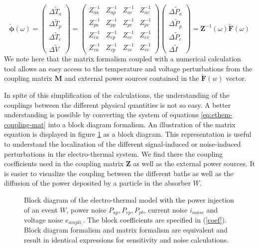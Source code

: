 \begin{equation}
\bm{\tilde{\phi}} (\omega) =
\left( \begin{array}{c}
\Delta \tilde{T}_a\\
\Delta \tilde{T}_p\\
\Delta \tilde{T}_e\\
\Delta \tilde{V}
\end{array} \right)
=
\left( \begin{array}{cccc}
 Z_{aa}^{-1}&Z_{ap}^{-1}&Z_{ae}^{-1}&Z_{av}^{-1} \\
 Z_{pa}^{-1}&Z_{pp}^{-1}&Z_{pe}^{-1}&Z_{pv}^{-1}\\
 Z_{ea}^{-1}&Z_{ep}^{-1}&Z_{ee}^{-1}&Z_{ev}^{-1}\\
 Z_{va}^{-1}&Z_{vp}^{-1}&Z_{ve}^{-1}&Z_{vv}^{-1}
\end{array} \right)
\left( \begin{array}{c}
\Delta \tilde{P}_a\\
\Delta \tilde{P}_p\\
\Delta \tilde{P}_e\\
\Delta \tilde{I}
\end{array} \right)
= \bm{Z}^{-1}(\omega) \bm{\tilde{F}} (\omega)
\end{equation}
We note here that the matrix formalism coupled with a numerical calculation tool allows an easy access to the temperature and voltage perturbations from the coupling matrix $\bm{M}$ and external power sources contained in the $\bm{\tilde{F}}(w)$ vector.

In spite of this simplification of the calculations, the understanding of the couplings between the different physical quantities is not so easy. A better understanding is possible by converting the system of equations \ref{eq:ethem-coupling-mat} into a block diagram formalism. 
An illustration of the matrix equation is displayed in figure \ref{fig:block-diagram} as a block diagram. This representation is useful to understand the localization of the different signal-induced or noise-induced perturbations in the electro-thermal system. We find there the coupling coefficients used in the coupling matrix $\bm{Z}$ as well as the external power sources. It is easier to visualize the coupling between the different baths as well as the diffusion of the power deposited by a particle in the absorber $W$.

\begin{figure}
\begin{center}
\resizebox{\textwidth}{!}{%
\begin{tikzpicture}
	
\end{tikzpicture}
}%
\end{center}
\caption{Block diagram of the electro-thermal model with the power injection of an event $W$, power noise $P_{ap}, P_{ep}, P_{pb}$, current noise $i_{noise}$ and voltage noise $e_{ampli.}$. The block coefficients are specified in (\ref{coef}). Block diagram formalism and matrix formalism are equivalent and result in identical expressions for sensitivity and noise calculations.
}
\label{fig:block-diagram}
\end{figure}

